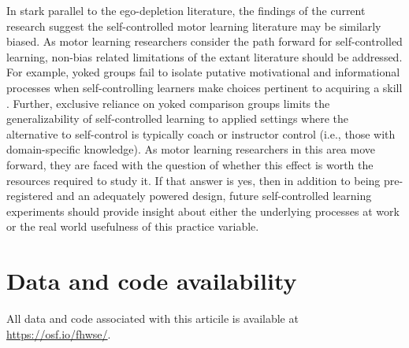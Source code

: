 \documentclass[man,floatsintext,hidelinks]{apa7}
\begin{document}
In stark parallel to the ego-depletion literature, the findings of the current research suggest the self-controlled motor learning literature may be similarly biased. As motor learning researchers consider the path forward for self-controlled learning, non-bias related limitations of the extant literature should be addressed. For example, yoked groups fail to isolate putative motivational and informational processes when self-controlling learners make choices pertinent to acquiring a skill \parencite{Carter2016-fq,Carter2017-mk,Lewthwaite2015-bd}. Further, exclusive reliance on yoked comparison groups limits the generalizability of self-controlled learning to applied settings where the alternative to self-control is typically coach or instructor control (i.e., those with domain-specific knowledge). As motor learning researchers in this area move forward, they are faced with the question of whether this effect is worth the resources required to study it. If that answer is yes, then in addition to being pre-registered and an adequately powered design, future self-controlled learning experiments should provide insight about either the underlying processes at work or the real world usefulness of this practice variable.

\section{Data and code availability}
All data and code associated with this articile is available at \href{https://osf.io/fhwse/}{https://osf.io/fhwse/}.

\printbibliography
\end{document}
